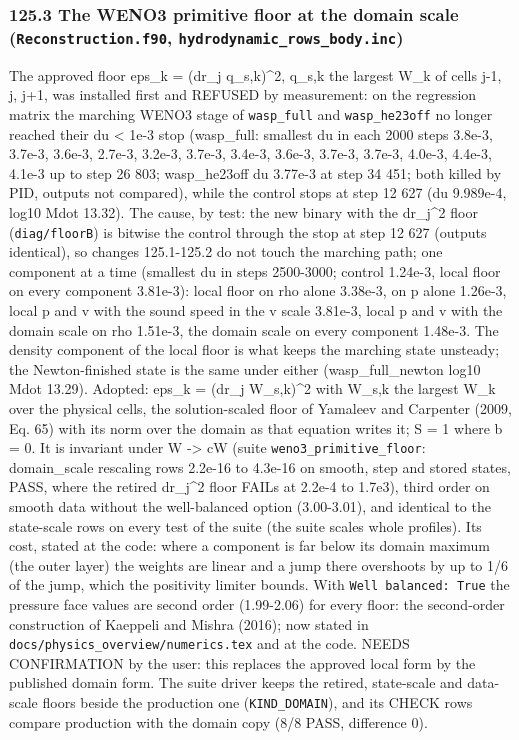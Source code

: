 \documentclass[english,a4paper]{my_memo}
\begin{document}
\subsubsection{\texorpdfstring{125.3 The WENO3 primitive floor at the domain scale (\texttt{Reconstruction.f90}, \texttt{hydrodynamic\_rows\_body.inc})}{125.3 The WENO3 primitive floor at the domain scale (Reconstruction.f90, hydrodynamic\_rows\_body.inc)}}\label{1253-the-weno3-primitive-floor-at-the-domain-scale-reconstructionf90-hydrodynamic_rows_bodyinc}

The approved floor eps\_k = (dr\_j q\_s,k)\^{}2, q\_s,k the largest \textbar W\_k\textbar{} of cells j-1, j, j+1, was installed first and REFUSED by measurement: on the regression matrix the marching WENO3 stage of \texttt{wasp\_full} and \texttt{wasp\_he23off} no longer reached their du \textless{} 1e-3 stop (wasp\_full: smallest du in each 2000 steps 3.8e-3, 3.7e-3, 3.6e-3, 2.7e-3, 3.2e-3, 3.7e-3, 3.4e-3, 3.6e-3, 3.7e-3, 3.7e-3, 4.0e-3, 4.4e-3, 4.1e-3 up to step 26 803; wasp\_he23off du 3.77e-3 at step 34 451; both killed by PID, outputs not compared), while the control stops at step 12 627 (du 9.989e-4, log10 Mdot 13.32). The cause, by test: the new binary with the dr\_j\^{}2 floor (\texttt{diag/floorB}) is bitwise the control through the stop at step 12 627 (outputs identical), so changes 125.1-125.2 do not touch the marching path; one component at a time (smallest du in steps 2500-3000; control 1.24e-3, local floor on every component 3.81e-3): local floor on rho alone 3.38e-3, on p alone 1.26e-3, local p and v with the sound speed in the v scale 3.81e-3, local p and v with the domain scale on rho 1.51e-3, the domain scale on every component 1.48e-3. The density component of the local floor is what keeps the marching state unsteady; the Newton-finished state is the same under either (wasp\_full\_newton log10 Mdot 13.29). Adopted: eps\_k = (dr\_j W\_s,k)\^{}2 with W\_s,k the largest \textbar W\_k\textbar{} over the physical cells, the solution-scaled floor of Yamaleev and Carpenter (2009, Eq. 65) with its norm over the domain as that equation writes it; S = 1 where b = 0. It is invariant under W -\textgreater{} cW (suite \texttt{weno3\_primitive\_floor}: domain\_scale rescaling rows 2.2e-16 to 4.3e-16 on smooth, step and stored states, PASS, where the retired dr\_j\^{}2 floor FAILs at 2.2e-4 to 1.7e3), third order on smooth data without the well-balanced option (3.00-3.01), and identical to the state-scale rows on every test of the suite (the suite scales whole profiles). Its cost, stated at the code: where a component is far below its domain maximum (the outer layer) the weights are linear and a jump there overshoots by up to 1/6 of the jump, which the positivity limiter bounds. With \texttt{Well\ balanced:\ True} the pressure face values are second order (1.99-2.06) for every floor: the second-order construction of Kaeppeli and Mishra (2016); now stated in \texttt{docs/physics\_overview/numerics.tex} and at the code. NEEDS CONFIRMATION by the user: this replaces the approved local form by the published domain form. The suite driver keeps the retired, state-scale and data-scale floors beside the production one (\texttt{KIND\_DOMAIN}), and its CHECK rows compare production with the domain copy (8/8 PASS, difference 0). 
\end{document}
